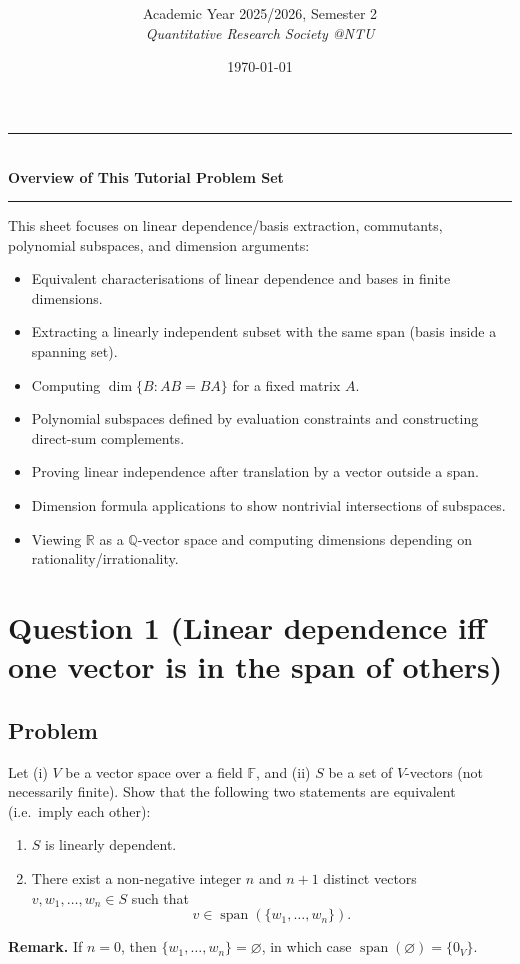 \documentclass[12pt]{article}
\title{
\CourseCode\ \CourseName \\[0.3em]
\large \DocType
}
\author{
  Academic Year 2025/2026, Semester 2 \\[0.25em]
  \textit{Quantitative Research Society @NTU}
}
\date{\today}
\newcommand{\F}{\mathbb{F}}
\newcommand{\Q}{\mathbb{Q}}
\newcommand{\R}{\mathbb{R}}
\newcommand{\Span}{\operatorname{span}}
\begin{document}
\maketitle
\thispagestyle{plainfirst}
\pagestyle{main}
\bigskip

\begin{center}
  \rule{0.8\textwidth}{0.4pt}\\[4pt]
  \textbf{Overview of This Tutorial Problem Set}\\[2pt]
  \rule{0.8\textwidth}{0.4pt}
\end{center}

\noindent
This sheet focuses on linear dependence/basis extraction, commutants, polynomial subspaces, and dimension arguments:
\begin{itemize}[leftmargin=*]
  \item Equivalent characterisations of linear dependence and bases in finite dimensions.
  \item Extracting a linearly independent subset with the same span (basis inside a spanning set).
  \item Computing \(\dim\{B: AB=BA\}\) for a fixed matrix \(A\).
  \item Polynomial subspaces defined by evaluation constraints and constructing direct-sum complements.
  \item Proving linear independence after translation by a vector outside a span.
  \item Dimension formula applications to show nontrivial intersections of subspaces.
  \item Viewing \(\R\) as a \(\Q\)-vector space and computing dimensions depending on rationality/irrationality.
\end{itemize}

\bigskip
\newpage
\tableofcontents

\newpage
\section{Question 1 (Linear dependence iff one vector is in the span of others)}
\subsection{Problem}
Let (i) \(V\) be a vector space over a field \(\F\), and (ii) \(S\) be a set of \(V\)-vectors (not necessarily finite).
Show that the following two statements are equivalent (i.e.\ imply each other):
\begin{enumerate}[label=(\alph*)]
\item \(S\) is linearly dependent.
\item There exist a non-negative integer \(n\) and \(n+1\) distinct vectors \(v,w_1,\ldots,w_n\in S\) such that
\[
v\in \Span(\{w_1,\ldots,w_n\}).
\]
\end{enumerate}
\noindent
\textbf{Remark.} If \(n=0\), then \(\{w_1,\ldots,w_n\}=\varnothing\), in which case \(\Span(\varnothing)=\{0_V\}\).
\end{document}
